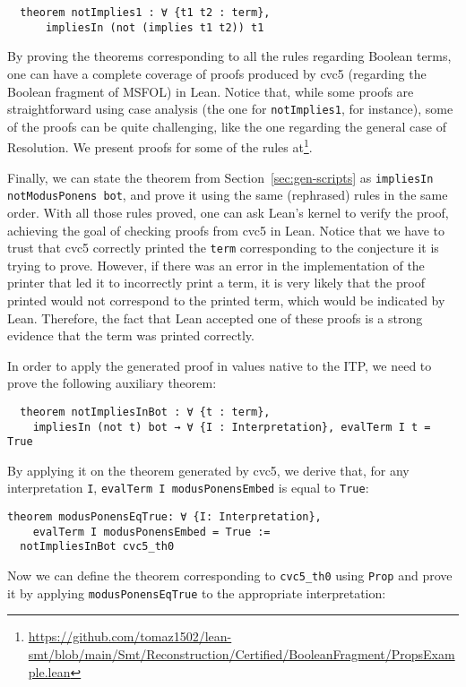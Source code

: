 \begin{verbatim}
  theorem notImplies1 : ∀ {t1 t2 : term},
      impliesIn (not (implies t1 t2)) t1
\end{verbatim}

By proving the theorems corresponding to all the rules regarding Boolean terms, one can have a
complete coverage of proofs produced by cvc5 (regarding the Boolean fragment of MSFOL) in Lean.
Notice that, while some proofs are straightforward using case analysis (the one for
\texttt{notImplies1}, for instance),
some of the proofs can be quite challenging, like the one regarding the general
case of Resolution. We present proofs for some of the rules at\footnote{\url{https://github.com/tomaz1502/lean-smt/blob/main/Smt/Reconstruction/Certified/BooleanFragment/PropsExample.lean}}.

Finally, we can state the theorem from Section~\ref{sec:gen-scripts} as
\texttt{impliesIn notModusPonens bot}, and prove it using the same
(rephrased) rules in the same order. With all those rules proved,
one can ask Lean's kernel to verify the proof, achieving the goal
of checking proofs from cvc5 in Lean. Notice that we have to trust
that cvc5 correctly printed the \texttt{term} corresponding to
the conjecture it is trying to prove. However, if there was an error
in the implementation of the printer that led it to incorrectly
print a term, it is very likely that the proof printed would not
correspond to the printed term, which would be indicated by Lean.
Therefore, the fact that Lean accepted
one of these proofs is a strong evidence that the term was printed
correctly.

In order to apply the generated proof in values native to the ITP, we need
to prove the following auxiliary theorem:

\begin{verbatim}
  theorem notImpliesInBot : ∀ {t : term},
    impliesIn (not t) bot → ∀ {I : Interpretation}, evalTerm I t = True
\end{verbatim}

By applying it on the theorem generated by cvc5, we derive that, for any
interpretation \texttt{I}, \texttt{evalTerm I modusPonensEmbed} is equal
to \texttt{True}:

\begin{verbatim}
theorem modusPonensEqTrue: ∀ {I: Interpretation},
    evalTerm I modusPonensEmbed = True :=
  notImpliesInBot cvc5_th0
\end{verbatim}

Now we can define the theorem corresponding to \texttt{cvc5\_th0} using
\texttt{Prop} and prove it by applying \texttt{modusPonensEqTrue} to
the appropriate interpretation:


